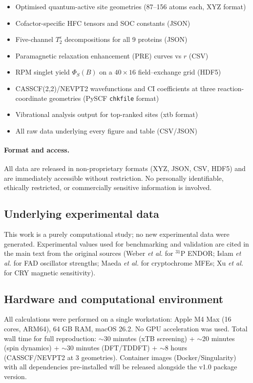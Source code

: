 \begin{itemize}
\setlength{\itemsep}{0pt}
\item Optimised quantum-active site geometries (87--156 atoms each, XYZ format)
\item Cofactor-specific HFC tensors and SOC constants (JSON)
\item Five-channel $T_2^e$ decompositions for all 9 proteins (JSON)
\item Paramagnetic relaxation enhancement (PRE) curves vs $r$ (CSV)
\item RPM singlet yield $\Phi_S(B)$ on a $40 \times 16$ field--exchange grid (HDF5)
\item CASSCF(2,2)/NEVPT2 wavefunctions and CI coefficients at three reaction-coordinate geometries (PySCF \texttt{chkfile} format)
\item Vibrational analysis output for top-ranked sites (xtb format)
\item All raw data underlying every figure and table (CSV/JSON)
\end{itemize}

\paragraph{Format and access.}
All data are released in non-proprietary formats (XYZ, JSON, CSV, HDF5) and are immediately accessible without restriction. No personally identifiable, ethically restricted, or commercially sensitive information is involved.

\subsection*{Underlying experimental data}

This work is a purely computational study; no new experimental data were generated. Experimental values used for benchmarking and validation are cited in the main text from the original sources (Weber \textit{et al.}\cite{Weber1998} for $^{31}$P ENDOR; Islam \textit{et al.}\cite{Islam2003} for FAD oscillator strengths; Maeda \textit{et al.}\cite{Maeda2012} for cryptochrome MFEs; Xu \textit{et al.}\cite{Xu2021} for CRY magnetic sensitivity).

\subsection*{Hardware and computational environment}

All calculations were performed on a single workstation: Apple M4 Max (16 cores, ARM64), 64 GB RAM, macOS 26.2. No GPU acceleration was used. Total wall time for full reproduction: $\sim$30 minutes (xTB screening) + $\sim$20 minutes (spin dynamics) + $\sim$30 minutes (DFT/TDDFT) + $\sim$8 hours (CASSCF/NEVPT2 at 3 geometries). Container images (Docker/Singularity) with all dependencies pre-installed will be released alongside the v1.0 package version.

